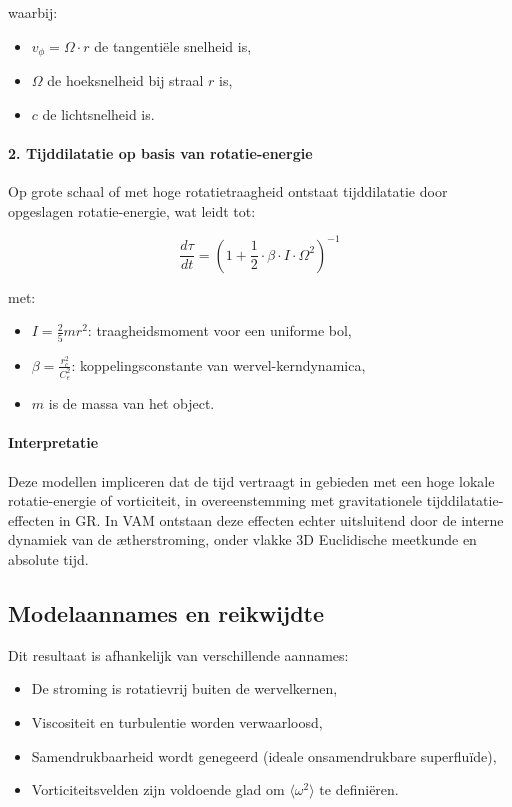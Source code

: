 waarbij:
\begin{itemize}
    \item \( v_\phi = \Omega \cdot r \) de tangentiële snelheid is,
    \item \( \Omega \) de hoeksnelheid bij straal \( r \) is,
    \item \( c \) de lichtsnelheid is.
\end{itemize}

\paragraph{2. Tijddilatatie op basis van rotatie-energie}

Op grote schaal of met hoge rotatietraagheid ontstaat tijddilatatie door opgeslagen rotatie-energie, wat leidt tot:

\begin{equation}
    \frac{d\tau}{dt} =
    \left(1 + \frac{1}{2} \cdot \beta \cdot I \cdot \Omega^2 \right)^{-1}
\end{equation}

met:
\begin{itemize}
    \item \( I = \frac{2}{5} m r^2 \): traagheidsmoment voor een uniforme bol,
    \item \( \beta = \frac{r_c^2}{C_e^2} \): koppelingsconstante van wervel-kerndynamica,
    \item \( m \) is de massa van het object. \end{itemize}

\paragraph{Interpretatie}

Deze modellen impliceren dat de tijd vertraagt in gebieden met een hoge lokale rotatie-energie of vorticiteit, in overeenstemming met gravitationele tijddilatatie-effecten in GR. In VAM ontstaan deze effecten echter uitsluitend door de interne dynamiek van de ætherstroming, onder vlakke 3D Euclidische meetkunde en absolute tijd.


\subsection{Modelaannames en reikwijdte}

Dit resultaat is afhankelijk van verschillende aannames:
\begin{itemize}
\item De stroming is rotatievrij buiten de wervelkernen,
\item Viscositeit en turbulentie worden verwaarloosd,
\item Samendrukbaarheid wordt genegeerd (ideale onsamendrukbare superfluïde),
\item Vorticiteitsvelden zijn voldoende glad om $\langle \omega^2 \rangle$ te definiëren.
\end{itemize}

